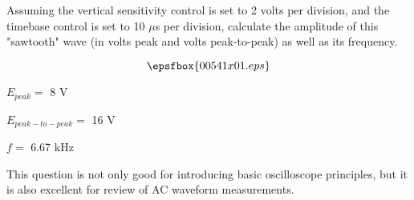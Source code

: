 

Assuming the vertical sensitivity control is set to 2 volts per division, and the timebase control is set to 10 $\mu$s per division, calculate the amplitude of this "sawtooth" wave (in volts peak and volts peak-to-peak) as well as its frequency.

$$\epsfbox{00541x01.eps}$$







\medskip
\item{} $E_{peak} =$ 8 V
\item{} $E_{peak-to-peak} =$ 16 V
\item{} $f =$ 6.67 kHz
\medskip







This question is not only good for introducing basic oscilloscope principles, but it is also excellent for review of AC waveform measurements.




